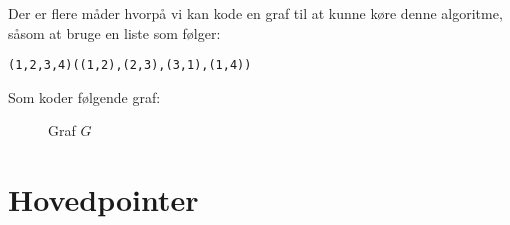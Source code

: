 Der er flere måder hvorpå vi kan kode en graf til at kunne køre denne algoritme, såsom at bruge en liste som følger:
\begin{verbatim}
(1,2,3,4)((1,2),(2,3),(3,1),(1,4))
\end{verbatim}
Som koder følgende graf:
\begin{figure}[ht]
	\centering
	\caption{\label{fig:label} Graf $G$}
\end{figure}

\section{Hovedpointer}%
\label{sec:tmhovedpointer}

